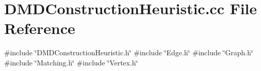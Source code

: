 \section{D\+M\+D\+Construction\+Heuristic.\+cc File Reference}
\label{DMDConstructionHeuristic_8cc}
{\ttfamily \#include \char`\"{}D\+M\+D\+Construction\+Heuristic.\+h\char`\"{}}\newline
{\ttfamily \#include \char`\"{}Edge.\+h\char`\"{}}\newline
{\ttfamily \#include \char`\"{}Graph.\+h\char`\"{}}\newline
{\ttfamily \#include \char`\"{}Matching.\+h\char`\"{}}\newline
{\ttfamily \#include \char`\"{}Vertex.\+h\char`\"{}}\newline
